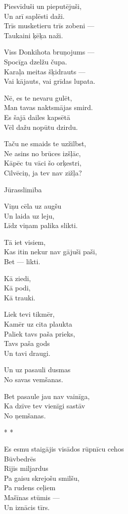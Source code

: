 \documentclass[14pt]{extarticle}
\begin{document}
Piesvīduši un pieputējuši,\\
Un arī saplēsti daži.\\
Trīs musketieru trīs zobeni ---\\
Taukaini ķēķa naži.

Viss Donkihota bruņojums ---\\
Spocīga dzelžu čupa.\\
Karaļa meitas šķidrauts ---\\
Vai kājauts, vai grīdas lupata.

Nē, es te nevaru gulēt,\\
Man tavas naktsmājas smird.\\
Es šajā dailes kapsētā\\
Vēl dažu nopūtu dzirdu.

Taču ne smaids te uzžilbst,\\
Ne asins no brūces izšļāc,\\
Kāpēc tu vāci šo orķestri,\\
Cilvēciņ, ja tev nav zižļa?


\newpage

{\large \sc Jūrasslimība}

Viņu cēla uz augšu\\
Un laida uz leju,\\
Līdz viņam palika slikti.

Tā iet visiem,\\
Kas itin nekur nav gājuši paši,\\
Bet --- likti.

Kā ziedi,\\
Kā podi,\\
Kā trauki.

Liek tevi tikmēr,\\
Kamēr uz cita plaukta\\
Paliek tavs paša prieks,\\
Tavs paša gods\\
Un tavi draugi.

Un uz pasauli dusmas\\
No savas vemšanas.

Bet pasaule jau nav vainīga,\\
Ka dzīve tev vienīgi sastāv\\
No ņemšanas.


\newpage

{\large \sc * * *}

Es esmu staigājis visādos rūpnīcu cehos\\
Būvbedrēs\\
Rijis miljardus\\
Pa gaisu skrejošu smilšu,\\
Pa rudens ceļiem\\
Mašīnas stūmis ---\\
Un iznācis tīrs.
\end{document}
